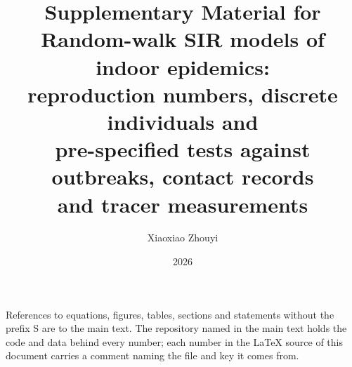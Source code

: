 \documentclass[11pt,a4paper]{article}
\title{Supplementary Material for\\[4pt]
Random-walk SIR models of indoor epidemics:\\ reproduction numbers, discrete individuals and\\
pre-specified tests against outbreaks, contact records\\ and tracer measurements}
\author{Xiaoxiao Zhouyi}
\date{\vspace{-1.5ex}2026\vspace{-2ex}}
\begin{document}
\maketitle

\noindent References to equations, figures, tables, sections and statements without the prefix S are to the main
text. The repository named in the main text holds the code and data behind every number; each number in the
LaTeX source of this document carries a comment naming the file and key it comes from.

\setcounter{tocdepth}{1}
\tableofcontents













{\small\setlength{\bibsep}{1pt plus 0.5pt}

}
\end{document}
